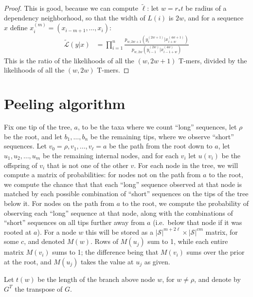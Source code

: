 \documentclass{article}
\newcommand{\calS}{\mathcal{S}}  %
\newcommand{\like}{\mathcal L}
\newcommand{\loglike}{\ell}
\newcommand{\alike}{\widetilde{\like}}
\newcommand{\aloglike}{\widetilde{\loglike}}
\theoremstyle{plain}
\theoremstyle{definition}
\begin{document}
\begin{proof}
This is good, because we can compute $\aloglike$:
let $w=r_*t$ be radius of a dependency neighborhood,
so that the width of $L(i)$ is $2w$,
and for a sequence $x$ define $x^{(m)}_i = (x_{i-m+1}, \ldots, x_i)$:
\begin{align}
    \alike(y|x)
    &=
    \prod_{i=1}^n
    \frac{
        p_{w,2w+1}(y^{(2w+1)}_i|x^{(4w+1)}_{i+w})
    }{
        p_{w,2w}(y^{(2w)}_{i-1}|x^{(4w)}_{i-1+w})
    }
\end{align}
This is the ratio of the likelihoods of all the $(w,2w+1)$ T-mers,
divided by the likelihoods of all the $(w,2w)$ T-mers.


\end{proof}


\section{Peeling algorithm}
\label{ss:peeling_algorithm}

Fix one tip of the tree, $a$, to be the taxa where we count ``long'' sequences, let $\rho$ be the root, and let $b_1, \ldots, b_n$ be the remaining tips,
where we observe ``short'' sequences.
Let $v_0=\rho, v_1, \ldots, v_\ell = a$ be the path from the root down to $a$,
let $u_1, u_2, \ldots, u_m$ be the remaining internal nodes,
and for each $v_i$ let $u(v_i)$ be the offspring of $v_i$ that is not one of the other $v$.
For each node in the tree,
we will compute a matrix of probabilities:
for nodes not on the path from $a$ to the root,
we compute the chance that that each ``long'' sequence observed at that node
is matched by each possible combination of ``short'' sequences on the tips of the tree below it.
For nodes on the path from $a$ to the root, we compute the probability of observing
each ``long'' sequence at that node, along with the combinations of ``short'' sequences
on all tips further away from $a$ (i.e.\ below that node if it was rooted at $a$).
For a node $w$ this will be stored as a $|\calS|^{m+2\ell} \times |\calS|^{cm}$ matrix, for some $c$,
and denoted $M(w)$.
Rows of $M(u_j)$ sum to 1,
while each entire matrix $M(v_i)$ sums to 1;
the difference being that $M(v_i)$ sums over the prior at the root,
and $M(u_j)$ takes the value at $u_j$ as given.

Let $t(w)$ be the length of the branch above node $w$, for $w \neq \rho$,
and denote by $G^T$ the transpose of $G$.
\end{document}
